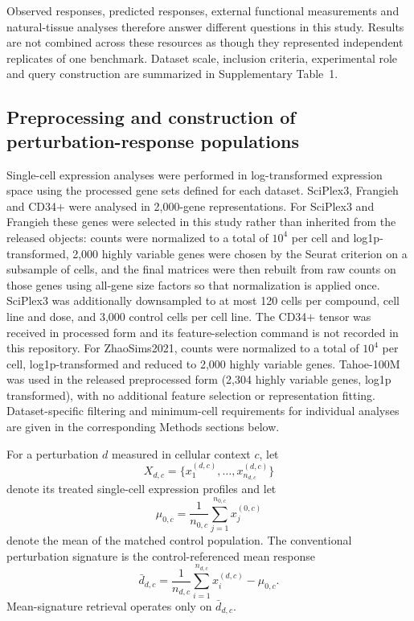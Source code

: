 \documentclass[11pt,letterpaper]{article}
\begin{document}
Observed responses, predicted responses, external functional measurements and natural-tissue analyses therefore answer different questions in this study. Results are not combined across these resources as though they represented independent replicates of one benchmark. Dataset scale, inclusion criteria, experimental role and query construction are summarized in Supplementary Table~1.


\subsection*{Preprocessing and construction of perturbation-response populations}

Single-cell expression analyses were performed in log-transformed expression space using the processed gene sets defined for each dataset. SciPlex3, Frangieh and CD34$+$ were analysed in 2,000-gene representations. For SciPlex3 and
Frangieh these genes were selected in this study rather than inherited from the released objects:
counts were normalized to a total of $10^4$ per cell and log1p-transformed, 2,000 highly variable
genes were chosen by the Seurat criterion\cite{Seurat} on a subsample of cells, and the final matrices were then
rebuilt from raw counts on those genes using all-gene size factors so that normalization is applied
once. SciPlex3 was additionally downsampled to at most 120 cells per compound, cell line and dose,
and 3,000 control cells per cell line. The CD34$+$ tensor was received in processed form and its
feature-selection command is not recorded in this repository. For ZhaoSims2021, counts were normalized to a total of $10^4$ per cell, log1p-transformed and reduced to 2,000 highly variable genes. Tahoe-100M was used in the released preprocessed form (2,304 highly variable genes, log1p transformed), with no additional feature selection or representation fitting. Dataset-specific filtering and minimum-cell requirements for individual analyses are given in the corresponding Methods sections below.

For a perturbation $d$ measured in cellular context $c$, let
$$
X_{d,c}=\{x^{(d,c)}_1,\ldots,x^{(d,c)}_{n_{d,c}}\}
$$
denote its treated single-cell expression profiles and let
$$
\mu_{0,c}
=
\frac{1}{n_{0,c}}
\sum_{j=1}^{n_{0,c}}x^{(0,c)}_j
$$
denote the mean of the matched control population. The conventional perturbation signature is the control-referenced mean response
$$
\bar d_{d,c}
=
\frac{1}{n_{d,c}}
\sum_{i=1}^{n_{d,c}}x^{(d,c)}_i
-
\mu_{0,c}.
$$
Mean-signature retrieval operates only on $\bar d_{d,c}$.
\end{document}
